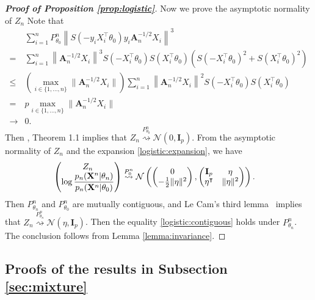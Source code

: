 \documentclass[11pt]{article}
\newcommand{\BA}{\mathbf{A}}    \newcommand{\BB}{\mathbf{B}}    \newcommand{\BC}{\mathbf{C}}    \newcommand{\BD}{\mathbf{D}}    \newcommand{\BE}{\mathbf{E}}    \newcommand{\BF}{\mathbf{F}}    \newcommand{\BG}{\mathbf{G}}    \newcommand{\BH}{\mathbf{H}}    \newcommand{\BI}{\mathbf{I}}    \newcommand{\BJ}{\mathbf{J}}    \newcommand{\BK}{\mathbf{K}}    \newcommand{\BL}{\mathbf{L}}
\newcommand{\myT}{\intercal}
\theoremstyle{plain}
\theoremstyle{definition}
\theoremstyle{remark}
\begin{document}
\begin{appendices}
\begin{proof}[\textbf{Proof of Proposition \ref{prop:logistic}}]
Now we prove the asymptotic normality of $Z_n$
Note that
\begin{align*}
    &
    \sum_{i=1}^n
    P_{\theta_0}^n
 \left\|
 S(-y_i X_i^\myT \theta_0)  
 y_i
 \BA_n^{-1/2}
 X_i
 \right\|^3
 \\
=&
    \sum_{i=1}^n
 \left\|
 \BA_n^{-1/2}
 X_i
 \right\|^3
 S(- X_i^\myT \theta_0)
 S(X_i^\myT \theta_0)
 \left(
 S(- X_i^\myT \theta_0)^2
 +
 S(X_i^\myT \theta_0)^2
\right)
 \\
 \leq&
 \left(
     \max_{i\in \{1,\dots,n\}}
 \|\BA_n^{-1/2}
 X_i\|
 \right)
    \sum_{i=1}^n
 \left\|
 \BA_n^{-1/2}
 X_i
 \right\|^2
 S(- X_i^\myT \theta_0)
 S(X_i^\myT \theta_0)
 \\
 =&
 p
     \max_{i\in \{1,\dots,n\}}
 \|\BA_n^{-1/2}
 X_i\|
 \\
 \to & 0
 .
\end{align*}
Then
\cite{Raic2019A}, Theorem 1.1 implies that
$Z_n \overset{P^n_{\theta_0}}{\rightsquigarrow} \mathcal N (0, \BI_p) $.
From the asymptotic normality of $Z_n$ and the expansion \eqref{logistic:expansion}, we have
\begin{align*}
    \left(
    \begin{matrix}
        \displaystyle
        Z_n
        \\
        \displaystyle
        \log \frac{p_n(\BX^{n}|\theta_n)}{p_n(\BX^{n}|\theta_0)}
    \end{matrix}
    \right)
    &\overset{P_0^n}{\rightsquigarrow}
    \mathcal{N}\left(
    \left(
    \begin{matrix}
        0\\
        -\frac{1}{2}\|\eta\|^2
    \end{matrix}
    \right),
    \left(
        \begin{matrix}
            \BI_p & \eta\\
            \eta^\myT  & \|\eta\|^2
        \end{matrix}
    \right)
    \right).
\end{align*}
Then
$P^n_{\theta_n}$ and $P^n_{\theta_0}$ are mutually contiguous, and Le Cam's third lemma~\citep[Example 6.7]{van2000asymptotic} implies that
$Z_n\overset{P^n_{\theta_n}}{\rightsquigarrow} \mathcal{N}(\eta , \BI_p)$.
Then the equality \eqref{logistic:contiguous} holds under $P_{\theta_n}^n$.
The conclusion follows from Lemma \ref{lemma:invariance}.
\end{proof}




\subsection{Proofs of the results in Subsection \ref{sec:mixture}}


\end{appendices}
\end{document}
